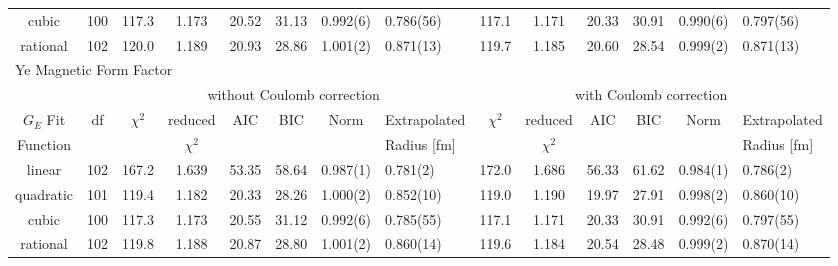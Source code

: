 \documentclass[10pt,aps,prc,twocolumn]{revtex4-1}
\begin{document}
\begin{table}
\begin{tabular}{cc|cccccl|cccccl}
cubic     & 100 & 117.3    & 1.173     & 20.52  & 31.13 & 0.992(6)   & 0.786(56) & 117.1    & 1.171     & 20.33  & 30.91  & 0.990(6)  & 0.797(56)    \\ 
rational  & 102 & 120.0    & 1.189     & 20.93  & 28.86 & 1.001(2)   & 0.871(13) & 119.7    & 1.185     & 20.60  & 28.54  & 0.999(2)  & 0.871(13)    \\ \hline \hline
\multicolumn{14}{l}{Ye Magnetic Form Factor}                                      \\ \hline
          &     & \multicolumn{6}{c}{without Coulomb correction}                 & \multicolumn{6}{|c}{with Coulomb correction} \\
$G_E$ Fit & df  & $\chi^2$ & reduced   & AIC    & BIC    & Norm      & Extrapolated    & $\chi^2$ & reduced   & AIC    & BIC    & Norm      & Extrapolated      \\  
Function  &     &          &$\chi^2$  &        &       &             & Radius [fm]      &          & $\chi^2$  &        &        &           & Radius [fm]    \\ \hline
linear    & 102 & 167.2    & 1.639    & 53.35  & 58.64 & 0.987(1)    & 0.781(2)  & 172.0    & 1.686     & 56.33  & 61.62  & 0.984(1)  & 0.786(2)    \\
quadratic & 101 & 119.4    & 1.182    & 20.33  & 28.26 & 1.000(2)    & 0.852(10) & 119.0    & 1.190     & 19.97  & 27.91  & 0.998(2)  & 0.860(10)    \\
cubic     & 100 & 117.3    & 1.173    & 20.55  & 31.12 & 0.992(6)    & 0.785(55) & 117.1    & 1.171     & 20.33  & 30.91  & 0.992(6)  & 0.797(55)    \\ 
rational  & 102 & 119.8    & 1.188    & 20.87  & 28.80 & 1.001(2)    & 0.860(14) & 119.6    & 1.184     & 20.54  & 28.48  & 0.999(2)  & 0.870(14)    \\ \hline \hline
\end{tabular}
\label{datatable}
\end{table}
\end{document}

